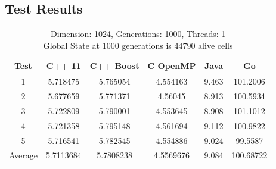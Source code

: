 \documentclass[11pt]{article} %
\begin{document}
\subsection{Test Results}
\begin{table}[ht]

\caption{Dimension: 1024, Generations: 1000, Threads: 1\\Global State at 1000 generations is 44790 alive cells} %

\centering %

\begin{tabular}{c c c c c c} %

\hline\hline %

Test & C++ 11 & C++ Boost & C OpenMP & Java & Go \\ [0.5ex] %


\hline %

1 & 5.718475 & 5.765054	& 4.554163 & 9.463 & 101.2006 \\
2 & 5.677659 & 5.771371 & 4.56045 & 8.913 & 100.5934 \\
3 & 5.722809 & 5.790001	& 4.553645 & 8.908 & 101.1012 \\
4 & 5.721358 & 5.795148 & 4.561694 & 9.112 & 100.9822 \\
5 & 5.716541 & 5.782545 & 4.554886 & 9.024 & 99.5587 \\
Average & 5.7113684 & 5.7808238 & 4.5569676 & 9.084 & 100.68722 \\ [1ex]

\hline %

\end{tabular}

\end{table}
\end{document}
